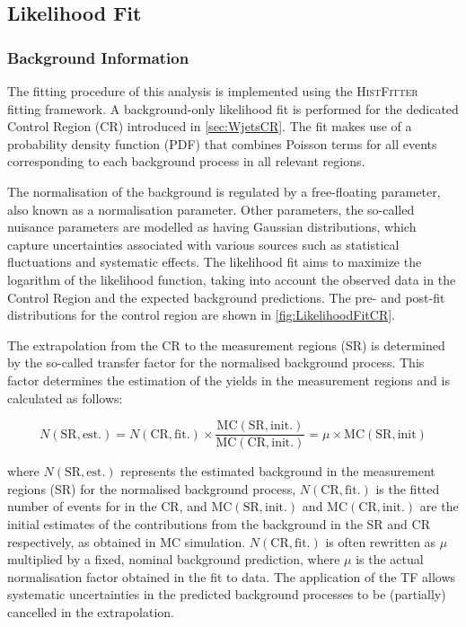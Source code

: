 \subsection{Likelihood Fit}%
\label{sec:LikelihoodFit}

\subsubsection{Background Information}

The fitting procedure of this analysis is implemented using the
\textsc{HistFitter}~\cite{Baak:2014wma} fitting framework.
A background-only likelihood fit is performed for the dedicated Control Region
(\Wjets CR) introduced in \cref{sec:WjetsCR}.
The fit makes use of a probability density function (PDF) that combines
Poisson terms for all events corresponding
to each background process in all relevant regions.

The normalisation of the \Wjets background is regulated by a free-floating
parameter, also known as a normalisation parameter.
Other parameters, the so-called nuisance parameters are modelled as having Gaussian distributions, which capture uncertainties associated with various sources such as statistical fluctuations and systematic effects. The likelihood fit aims to maximize the logarithm of the likelihood
function, taking into account the observed data in the Control Region and
the expected background predictions.
The pre- and post-fit distributions for the control region are shown in \cref{fig:LikelihoodFitCR}. 

The extrapolation from the CR to the measurement regions (SR) is determined by
the so-called transfer factor for the normalised \Wjets background process.
This factor determines the estimation of the yields in the measurement regions
and is calculated as follows: 

\begin{equation}
  N\mathrm{(SR, est.)} = N\mathrm{(CR, fit.)} \times \dfrac{\mathrm{MC}\mathrm{(SR, init.)}}{\mathrm{MC}\mathrm{(CR, init.)}} = \mu \times \mathrm{MC}\mathrm{(SR, init)}
  \label{eq:transferFactor}
\end{equation}

where \(N\mathrm{(SR, est.)} \) represents the estimated background
in the measurement regions (SR) for the normalised \Wjets background process,
\(N\mathrm{(CR, fit.)}\) is the fitted number of  events for \Wjets in the CR,
and \({\mathrm{MC}\mathrm{(SR, init.)}}\) and \({\mathrm{MC}\mathrm{(CR, init.)}}\)
are the initial estimates of the contributions from the \Wjets background
in the SR and CR respectively, as obtained in MC simulation.
\(N\mathrm{(CR, fit.)}\) is often
rewritten as \( \mu \) multiplied by a fixed, nominal background prediction,
where \( \mu \) is the actual normalisation factor obtained in the fit to data.
The application of the TF allows systematic uncertainties in the predicted
background processes to be (partially) cancelled in the extrapolation.



